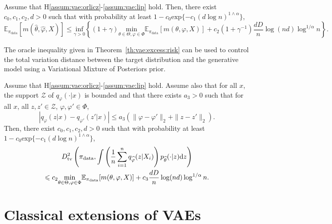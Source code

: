 \documentclass[english,graybox,envcountchap,envcountsame,sectrefs,shortlabels]{svmono}
\theoremstyle{style}
\newcommand{\eqsp}{}
\begin{document}
\begin{theorem}
\label{th:vae:excess:risk}
Assume that H\ref{assum:vae:orlicz}-\ref{assum:vae:lip} hold. Then, there exist $c_0,c_1,c_2,d>0$ such that with probability at least $1- c_0 \mathrm{exp}\{-c_1(d\log n)^{1\wedge \alpha}\}$,
$$
\mathbb{E}_{\pi_{\mathrm{data}}}\left[m(\widehat \theta,\widehat\varphi,X)\right]\leqslant \underset{\gamma>0}{\mathrm{inf}}\left\{(1+\gamma) \underset{\theta\in\Theta,\varphi\in\Phi}{\mathrm{min}}\mathbb{E}_{\pi_{\mathrm{data}}}[m(\theta,\varphi,X)] + c_2(1+\gamma^{-1})\frac{dD}{n}\log(nd)\log^{1/\alpha}n\right\}\eqsp.
$$
\end{theorem}
The oracle inequality given in Theorem~\ref{th:vae:excess:risk} can be used to control the total variation distance between the target distribution and the generative model  using a Variational Mixture of Posteriors prior.
\begin{proposition}
\label{prop:vaemixtprior}
Assume that H\ref{assum:vae:orlicz}-\ref{assum:vae:lip} hold. Assume also that for all $x$, the support $\mathcal{Z}$ of $q_\varphi(\cdot|x)$ is bounded and that there exists $a_3>0$ such that for all $x$, all $z,z'\in \mathcal{Z}$, $\varphi,\varphi'\in\Phi$,
$$
\left|q_\varphi(z|x) - q_{\varphi'}(z'|x)\right| \leqslant a_3 \left( \|\varphi-\varphi'\|_2 + \|z-z'\|_2\right)\eqsp.
$$
Then, there exist $c_0,c_1,c_2,d>0$ such that with probability at least $1- c_0 \mathrm{exp}\{-c_1(d\log n)^{1\wedge \alpha}\}$,
\begin{multline*}
D_{\mathrm{tv}}^2\left(\pi_{\mathrm{data}},\int \left(\frac{1}{n}\sum_{i=1}^n q_{\widehat \varphi}(z|X_i)\right)p_{\widehat \theta}(\cdot|z)\rmd z\right)\\
\leqslant c_2 \underset{\theta\in\Theta,\varphi\in\Phi}{\mathrm{min}}\mathbb{E}_{\pi_{\mathrm{data}}}[m(\theta,\varphi,X)] + c_3\frac{dD}{n}\log(nd)\log^{1/\alpha}n\eqsp.
\end{multline*}
\end{proposition}

\section{Classical extensions of VAEs}
\end{document}
